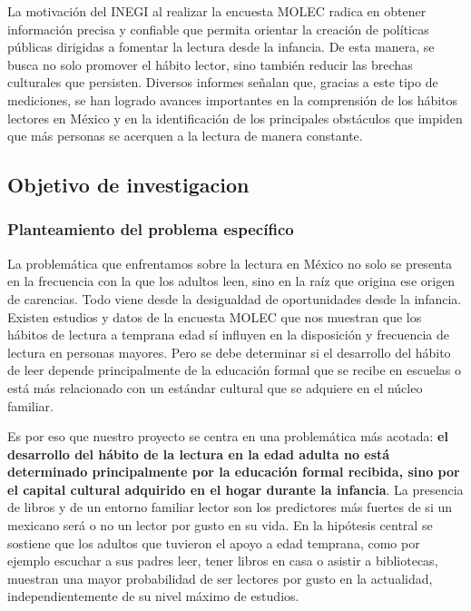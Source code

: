 \documentclass[aps,reprint]{revtex4-2}
\begin{document}
La motivación del INEGI al realizar la encuesta MOLEC radica en obtener información precisa y confiable que permita orientar la creación de políticas públicas dirigidas a fomentar la lectura desde la infancia. De esta manera, se busca no solo promover el hábito lector, sino también reducir las brechas culturales que persisten. Diversos informes señalan que, gracias a este tipo de mediciones, se han logrado avances importantes en la comprensión de los hábitos lectores en México y en la identificación de los principales obstáculos que impiden que más personas se acerquen a la lectura de manera constante.\cite{noauthor_modulo_2020}
\subsection{Objetivo de investigacion}
\subsubsection{Planteamiento del problema específico}
La problemática que enfrentamos sobre la lectura en México no solo se presenta en la frecuencia con la que los adultos leen, sino en la raíz que origina ese origen de carencias. Todo viene desde la desigualdad de oportunidades desde la infancia. Existen estudios y datos de la encuesta MOLEC que nos muestran que los hábitos de lectura a temprana edad sí influyen en la disposición y frecuencia de lectura en personas mayores. Pero se debe determinar si el desarrollo del hábito de leer depende principalmente de la educación formal que se recibe en escuelas o está más relacionado con un estándar cultural que se adquiere en el núcleo familiar.  

Es por eso que nuestro proyecto se centra en una problemática más acotada: \textbf{el desarrollo del hábito de la lectura en la edad adulta no está determinado principalmente por la educación formal recibida, sino por el capital cultural adquirido en el hogar durante la infancia}. La presencia de libros y de un entorno familiar lector son los predictores más fuertes de si un mexicano será o no un lector por gusto en su vida. En la hipótesis central se sostiene que los adultos que tuvieron el apoyo a edad temprana, como por ejemplo escuchar a sus padres leer, tener libros en casa o asistir a bibliotecas, muestran una mayor probabilidad de ser lectores por gusto en la actualidad, independientemente de su nivel máximo de estudios.  
\end{document}
